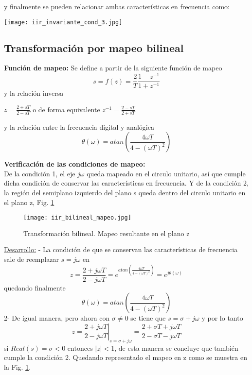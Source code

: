 \documentclass[informe.tex]{subfiles}
\begin{document}
{y finalmente se pueden relacionar ambas características en frecuencia como:
	
	\begin{center}
	\texttt{[image: iir\_invariante\_cond\_3.jpg]}		
	\end{center}
}			
		
\newpage
\subsection{Transformación por mapeo bilineal}
{
\textbf{Función de mapeo:}\newline
Se define a partir de la siguiente función de mapeo
	$$
	s=f(z)= \frac{2}{T}
	        \frac{1-z^{-1}}{1+z^{-1}}
	$$
y la relación inversa
	\begin{center}
	$
		z=\frac{2+sT}{2-sT}
	$
	o de forma equivalente
	$
		z^{-1}=\frac{2-sT}{2+sT}
	$		
	\end{center}	
 y la relación entre la frecuencia digital y analógica
	$$
		\theta(\omega) = atan \left( 
								\frac{4\omega T}
									 {4-(\omega T)^2}
							 \right)
	$$

\textbf{Verificación de las condiciones de mapeo:}\\

De la condición 1, el eje $j\omega$ queda mapeado en el circulo unitario, así que cumple dicha condición de conservar las características en frecuencia. Y de la condición 2, la región del semiplano izquierdo del plano s queda dentro del circulo unitario en el plano z, Fig. \ref{fig:iir:bilineal_1_2}

	\begin{figure}[h!]
	\centering
	\texttt{[image: iir\_bilineal\_mapeo.jpg]}	
	\caption{Transformación bilineal. Mapeo resultante en el plano z}
	\label{fig:iir:bilineal_1_2}
	\end{figure}	

\underline{Desarrollo:} - La condición de que se conservan las características de frecuencia sale de reemplazar  $s=j\omega$ en
	$$
		z = \frac{ 2 + j\omega T}
		         { 2 - j\omega T}
		  = 
		  e^{ 
		     atan \left( \frac{ 4 \omega T}
		               { 4 - (\omega T)^2}
		          \right)
		   }
		 = 
		 e^{j \theta(\omega)}
	$$
quedando finalmente 
	$$
		\theta(\omega) = atan \left( 
								\frac{4\omega T}
									 {4-(\omega T)^2}
							 \right)	
	$$
2- De igual manera, pero ahora con $\sigma \neq 0$ se tiene que $s=\sigma + j\omega$	y por lo tanto
	$$
		z = \left. \frac{ 2 + j\omega T}
		         { 2 - j\omega T} \right|_{s=\sigma + j\omega}
		  = 
		  \frac{ 2 + \sigma T + j \omega T }{ 2 - \sigma T - j \omega T }		  		
    $$		 
si $Real(s)=\sigma <0$ entonces $|z|<1$, de esta manera se concluye que también cumple la condición 2. Quedando representado el mapeo en z como se muestra en la Fig. \ref{fig:iir:bilineal_1_2}.\newline


}
\end{document}
